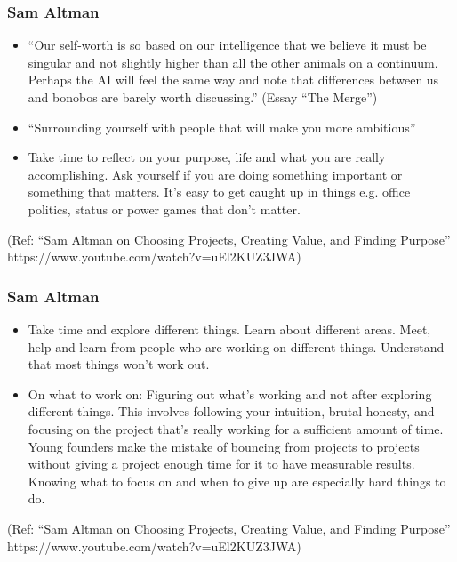 \begin{frame}[fragile]\frametitle{Sam Altman}

\begin{itemize}

\item ``Our self-worth is so based on our intelligence that we believe it must be singular and not slightly higher than all the other animals on a continuum. Perhaps the AI will feel the same way and note that differences between us and bonobos are barely worth discussing.'' (Essay ``The Merge'')
\item “Surrounding yourself with people that will make you more ambitious”
\item Take time to reflect on your purpose, life and what you are really accomplishing. Ask yourself if you are doing something important or something that matters. It's easy to get caught up in things e.g. office politics, status or power games that don't matter. 
\end{itemize}

{\tiny (Ref: ``Sam Altman on Choosing Projects, Creating Value, and Finding Purpose'' https://www.youtube.com/watch?v=uEl2KUZ3JWA)}
\end{frame}

\begin{frame}[fragile]\frametitle{Sam Altman}

\begin{itemize}

\item Take time and explore different things. Learn about different areas. Meet, help and learn from people who are working on different things. Understand that most things won’t work out. 
\item On what to work on: Figuring out what’s working and not after exploring different things. This involves following your intuition, brutal honesty, and focusing on the project that's really working for a sufficient amount of time. Young founders make the mistake of bouncing from projects to projects without giving a project enough time for it to have measurable results. Knowing what to focus on and when to give up are especially hard things to do.  
\end{itemize}

{\tiny (Ref: ``Sam Altman on Choosing Projects, Creating Value, and Finding Purpose'' https://www.youtube.com/watch?v=uEl2KUZ3JWA)}
\end{frame}

